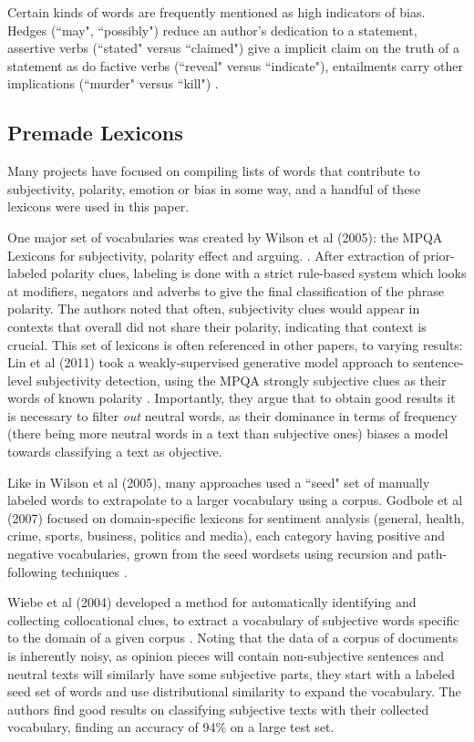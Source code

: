 \documentclass[11pt, a4paper]{article}
\begin{document}
Certain kinds of words are frequently mentioned as high indicators of bias. Hedges (``may", ``possibly") reduce an author's dedication to a statement, assertive verbs (``stated" versus ``claimed") give a implicit claim on the truth of a statement as do factive verbs (``reveal" versus ``indicate"), entailments carry other implications (``murder" versus ``kill") \cite{recasens2013linguistic}.

\subsection{Premade Lexicons} \label{premade-lexicons}

Many projects have focused on compiling lists of words that contribute to subjectivity, polarity, emotion or bias in some way, and a handful of these lexicons were used in this paper.

One major set of vocabularies was created by Wilson et al (2005): the MPQA Lexicons for subjectivity, polarity effect and arguing. \cite{wilson2005recognizing}. After extraction of prior-labeled polarity clues, labeling is done with a strict rule-based system which looks at modifiers, negators and adverbs to give the final classification of the phrase polarity. The authors noted that often, subjectivity clues would appear in contexts that overall did not share their polarity, indicating that context is crucial. This set of lexicons is often referenced in other papers, to varying results: Lin et al (2011) took a weakly-supervised generative model approach to sentence-level subjectivity detection, using the MPQA strongly subjective clues as their words of known polarity \cite{lin2011sentence}. Importantly, they argue that to obtain good results it is necessary to filter \textit{out} neutral words, as their dominance in terms of frequency (there being more neutral words in a text than subjective ones) biases a model towards classifying a text as objective. 

Like in Wilson et al (2005), many approaches used a ``seed" set of manually labeled words to extrapolate to a larger vocabulary using a corpus. Godbole et al (2007) focused on domain-specific lexicons for sentiment analysis (general, health, crime, sports, business, politics and media), each category having positive and negative vocabularies, grown from the seed wordsets using recursion and path-following techniques \cite{godbole2007largescale}.

Wiebe et al (2004) developed a method for automatically identifying and collecting collocational clues, to extract a vocabulary of subjective words specific to the domain of a given corpus \cite{wiebe2004learning}. Noting that the data of a corpus of documents is inherently noisy, as opinion pieces will contain non-subjective sentences and neutral texts will similarly have some subjective parts, they start with a labeled seed set of words and use distributional similarity to expand the vocabulary. The authors find good results on classifying subjective texts with their collected vocabulary, finding an accuracy of 94\% on a large test set.
\end{document}
